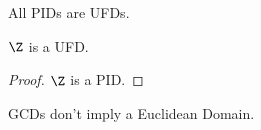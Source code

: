 \begin{proposition}
All PIDs are UFDs.
\end{proposition}

\begin{proposition}
$\Z$ is a UFD.
\end{proposition}

\begin{proof}
$\Z$ is a PID.
\end{proof}

\begin{proposition}
GCDs don't imply a Euclidean Domain.
\end{proposition}